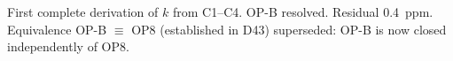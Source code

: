 \documentclass[12pt,a4paper]{article}
\theoremstyle{plain}
\theoremstyle{definition}
\theoremstyle{remark}
\begin{document}
\begin{description}[nosep]
\item[Version~1] First complete derivation of $k$ from C1--C4. OP-B resolved. Residual 0.4~ppm. Equivalence OP-B $\equiv$ OP8 (established in D43) superseded: OP-B is now closed independently of OP8.
\end{description}



\end{document}
